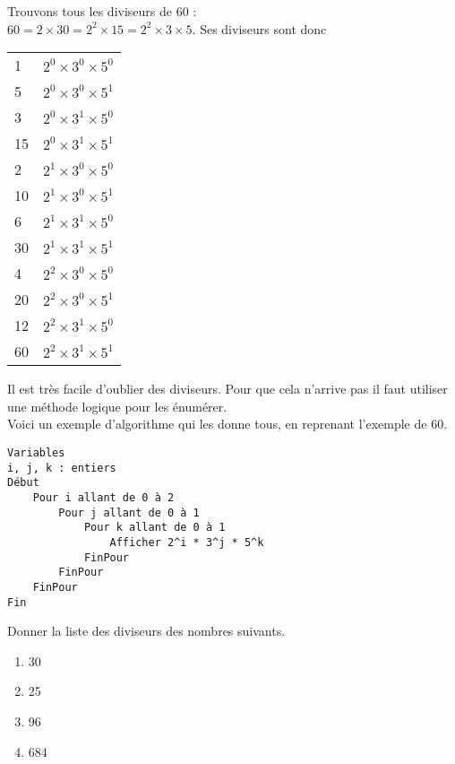 \documentclass[a4paper,12pt,french]{book}
\begin{document}
\begin{exemple}[]
	Trouvons tous les diviseurs de 60 : \\
	$60=2\times30=2^2\times 15=2^2\times 3\times 5$.
	Ses diviseurs sont donc \\
	
	\begin{tabular}{l|l}
		1 & $2^0\times 3^0\times 5^0$\\
		5 & $2^0\times 3^0\times 5^1$\\
		3 & $2^0\times 3^1\times 5^0$\\
		15 & $2^0\times 3^1\times 5^1$\\
		2 & $2^1\times 3^0\times 5^0$\\
		10 & $2^1\times 3^0\times 5^1$\\
		6 & $2^1\times 3^1\times 5^0$\\
		30 & $2^1\times 3^1\times 5^1$\\
		4 & $2^2\times 3^0\times 5^0$\\
		20 & $2^2\times 3^0\times 5^1$\\
		12 & $2^2\times 3^1\times 5^0$\\
		60 & $2^2\times 3^1\times 5^1$\\
		\end{tabular}
\end{exemple}

Il est très facile d'oublier des diviseurs. Pour que cela n'arrive pas il faut utiliser une méthode logique pour les énumérer.\\
Voici un exemple d'algorithme qui les donne tous, en reprenant l'exemple de 60.\newpage

\begin{verbatim}
Variables
i, j, k : entiers
Début
    Pour i allant de 0 à 2
        Pour j allant de 0 à 1
            Pour k allant de 0 à 1
                Afficher 2^i * 3^j * 5^k
            FinPour
        FinPour
    FinPour
Fin
\end{verbatim}


\begin{exercice}[]
	
	Donner la liste des diviseurs des nombres suivants.
	
	\begin{multicols}{4}
		\begin{enumerate}[\bfseries a.]
			\item 30
			\item 25
			\item 96
			\item 684
		\end{enumerate}
	\end{multicols}
	
\end{exercice}
\end{document}
